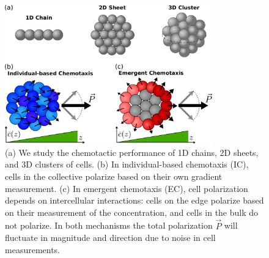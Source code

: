 \begin{figure}
    \centering
        \includegraphics[width=0.8\textwidth]{../fig/ch3_fig1.pdf}
    \caption{(a) We study the chemotactic performance of 1D chains, 2D sheets, and 3D clusters of cells. (b) In individual-based chemotaxis (IC), cells in the collective polarize based on their own gradient measurement. (c) In emergent chemotaxis (EC), cell polarization depends on intercellular interactions: cells on the edge polarize based on their measurement of the concentration, and cells in the bulk do not polarize. In both mechanisms the total polarization $\vec{P}$ will fluctuate in magnitude and direction due to noise in cell measurements.} \label{fig:1}
\end{figure}

